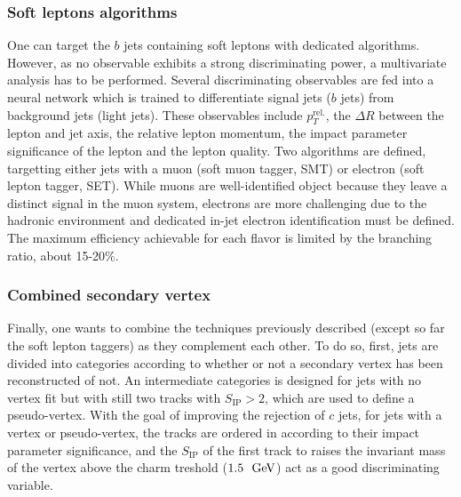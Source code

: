 
        \subsubsection{Soft leptons algorithms}

    One can target the $b$ jets containing soft leptons with dedicated algorithms. However,
    as no observable exhibits a strong discriminating power, a multivariate analysis
    has to be performed. Several discriminating observables are fed into a neural network
    which is trained to differentiate signal jets ($b$ jets) from background jets (light jets).
    These observables include $p_T^\text{rel.}$, the $\Delta R$ between the lepton and
    jet axis, the relative lepton momentum, the impact parameter significance of the lepton
    and the lepton quality. Two algorithms are defined, targetting either jets with a
    muon (soft muon tagger, SMT) or electron (soft lepton tagger, SET). While muons are
    well-identified object because they leave a distinct signal in the muon system,
    electrons are more challenging due to the hadronic environment and dedicated in-jet
    electron identification must be defined. The maximum efficiency achievable for each
    flavor is limited by the branching ratio, about 15-20\%.


        \subsubsection{Combined secondary vertex}

    Finally, one wants to combine the techniques previously described (except so far the
    soft lepton taggers) as they complement each other. To do so, first, jets are divided
    into categories according to whether or not a secondary vertex has been reconstructed
    of not. An intermediate categories is designed for jets with no vertex fit but
    with still two tracks with $S_\text{IP} > 2$, which are used to define a pseudo-vertex.
    With the goal of improving the rejection of $c$ jets, for jets with a vertex or pseudo-vertex,
    the tracks are ordered in according to their impact parameter significance, and the
    $S_\text{IP}$ of the first track to raises the invariant mass of the vertex above
    the charm treshold ($1.5~~\text{GeV}$) act as a good discriminating variable.


